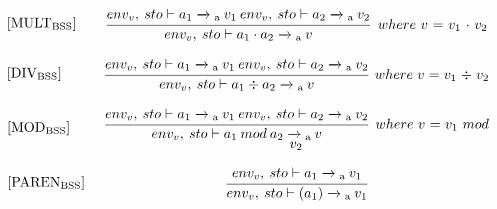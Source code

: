 \begin{equation}
\begin{minipage}{.2\linewidth}
$[\text{MULT}_\text{BSS}]$
\end{minipage}
\begin{minipage}{.8\linewidth}
\centering
$\cfrac{env_v, \: sto \vdash a_1 \xrightarrow{}\textsubscript{a} \: v_1 \: env_v, \: sto \vdash a_2 \xrightarrow{}\textsubscript{a} \: v_2}{env_v, \: sto \vdash a_1 \cdot a_2 \xrightarrow{}\textsubscript{a} \: v}$
$ \: where$ $v$ $=$ $v_1$ $\cdot$ $v_2$
\end{minipage}
\end{equation}

\begin{equation}
\begin{minipage}{.2\linewidth}
$[\text{DIV}_\text{BSS}]$
\end{minipage}
\begin{minipage}{.8\linewidth}
\centering
$\cfrac{env_v, \: sto \vdash a_1 \xrightarrow{}\textsubscript{a} \: v_1 \: env_v, \: sto \vdash a_2 \xrightarrow{}\textsubscript{a} \: v_2}{env_v, \: sto \vdash a_1 \div a_2 \xrightarrow{}\textsubscript{a} \: v}$
$ \: where$ $v$ $=$ $v_1$ $\div$ $v_2$
\end{minipage}
\end{equation}

\begin{equation}
\begin{minipage}{.2\linewidth}
$[\text{MOD}_\text{BSS}]$
\end{minipage}
\begin{minipage}{.8\linewidth}
\centering
$\cfrac{env_v, \: sto \vdash a_1 \xrightarrow{}\textsubscript{a} \: v_1 \: env_v, \: sto \vdash a_2 \xrightarrow{}\textsubscript{a} \: v_2}{env_v, \: sto \vdash a_1 \: mod \: a_2 \xrightarrow{}\textsubscript{a} \: v}$
$ \: where$ $v$ $=$ $v_1$ $mod$ $v_2$
\end{minipage}
\end{equation}

\begin{equation}
\begin{minipage}{.2\linewidth}
$[\text{PAREN}_\text{BSS}]$
\end{minipage}
\begin{minipage}{.8\linewidth}
\centering
$\cfrac{env_v, \: sto \vdash a_1 \xrightarrow{}\textsubscript{a} \: v_1}{env_v, \: sto \vdash (a_1) \xrightarrow{}\textsubscript{a} \: v_1}$
\end{minipage}
\end{equation}

